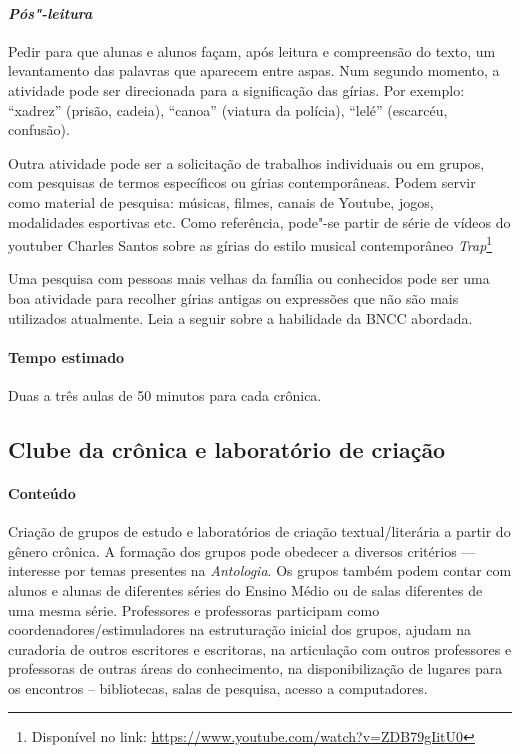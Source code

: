 \documentclass[11pt]{extarticle}
\begin{document}
\paragraph{\textit{Pós"-leitura}}

Pedir para que alunas e alunos façam, após leitura e compreensão do
texto, um levantamento das palavras que aparecem entre aspas. Num
segundo momento, a atividade pode ser direcionada para a significação
das gírias. Por exemplo: ``xadrez'' (prisão, cadeia), ``canoa'' (viatura
da polícia), ``lelé'' (escarcéu, confusão).

Outra atividade pode ser a solicitação de trabalhos individuais ou em
grupos, com pesquisas de termos específicos ou gírias contemporâneas.
Podem servir como material de pesquisa: músicas, filmes, canais de
Youtube, jogos, modalidades esportivas etc. Como referência, pode"-se
partir de série de vídeos do youtuber Charles Santos sobre as gírias do
estilo musical contemporâneo \emph{Trap}\footnote{Disponível no link:
  \url{https://www.youtube.com/watch?v=ZDB79gIitU0}}

Uma pesquisa com pessoas mais velhas da família ou conhecidos pode ser
uma boa atividade para recolher gírias antigas ou expressões que não são
mais utilizados atualmente.
Leia a seguir sobre a habilidade da BNCC abordada.

\paragraph{Tempo estimado} Duas a três aulas de 50 minutos para cada
crônica.


\subsection{Clube da crônica e laboratório de criação}


\paragraph{Conteúdo} Criação de grupos de estudo e laboratórios de criação
textual/literária a partir do gênero crônica. A formação dos grupos pode
obedecer a diversos critérios --- interesse por temas presentes na
\emph{Antologia}. Os grupos também podem
contar com alunos e alunas de diferentes séries do Ensino Médio ou de
salas diferentes de uma mesma série. Professores e professoras
participam como coordenadores/estimuladores na estruturação inicial dos
grupos, ajudam na curadoria de outros escritores e escritoras, na
articulação com outros professores e professoras de outras áreas do
conhecimento, na disponibilização de lugares para os encontros --
bibliotecas, salas de pesquisa, acesso a computadores.
\end{document}
